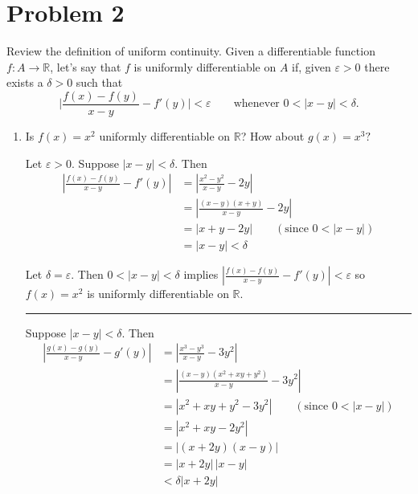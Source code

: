 \documentclass[12pt]{article}
\newcommand{\R}{\mathbb{R}}
\newcommand{\abs}[1]{\left\vert #1 \right\vert}
\newcommand{\ep}{\varepsilon}
\begin{document}
\pagebreak

\section{Problem 2 }
Review the definition of uniform continuity. Given a differentiable function $f:A\to\mathbb{R}$, let's say that $f$ is uniformly differentiable on $A$ if, given $\ep>0$ there exists a $\delta>0$ such that
\begin{equation*}
	\bigg|\frac{f(x)-f(y)}{x-y}-f'(y) \bigg|<\ep\qquad\text{whenever }0<|x-y|<\delta.
\end{equation*}
\begin{enumerate}
	\item Is $f(x)=x^2$ uniformly differentiable on $\mathbb{R}$? How about $g(x)=x^3?$
	
        \color{blue}
            Let $\ep > 0$. Suppose $\abs{x - y} < \delta$. Then
            \begin{align*}
                \abs{\frac{f(x) - f(y)}{x - y} - f'(y)} &= \abs{\frac{x^2 - y^2}{x - y} - 2y} \\
                &= \abs{\frac{(x - y)(x + y)}{x - y} -2y}\\ 
                &= \abs{x + y - 2y} \qquad (\text{since }0 < \abs{x - y})\\
                &= \abs{x - y} < \delta
            \end{align*}

            Let $\delta = \ep$. Then $0 < \abs{x - y} < \delta$ implies $\abs{\frac{f(x) - f(y)}{x - y} - f'(y)} < \ep$ so $f(x) = x^2$ is uniformly differentiable on $\R$.

            \vspace*{10pt}
            \hrule 
            \vspace*{10pt}

            Suppose $\abs{x - y} < \delta$. Then
            \begin{align*}
                \abs{\frac{g(x) - g(y)}{x - y} - g'(y)} &= \abs{\frac{x^3 - y^3}{x - y} - 3y^2} \\
                &= \abs{\frac{(x - y)(x^2 + xy + y^2)}{x - y} - 3y^2}\\ 
                &= \abs{x^2 + xy + y^2 - 3y^2} \qquad (\text{since }0 < \abs{x - y})\\
                &= \abs{x^2 + xy - 2y^2} \\
                &= \abs{(x + 2y)(x - y)}\\ 
                &= \abs{x + 2y}\, \abs{x - y}\\
                &< \delta \abs{x + 2y}
            \end{align*}


\end{enumerate}
\end{document}
